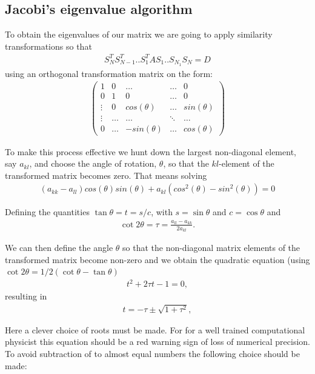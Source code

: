 \documentclass[11pt,a4paper,english,draft]{article}
\numberwithin{equation}{section}
\begin{document}
\subsection{Jacobi's eigenvalue algorithm}

To obtain the eigenvalues of our matrix we are going to apply similarity transformations so that
\begin{align*}
S_N^T S_{N-1}^T .. S_1^T A S_1 .. S_{N_1} S_{N} = D
\end{align*}
using an orthogonal transformation matrix on the form:
\begin{align*}
\begin{pmatrix} 1 & 0 & \dots   & \dots    & 0     \\
                0 & 1 & 0 & \dots    & 0   \\
                \vdots & 0 & cos(\theta) & \dots  & sin(\theta)        \\
        \vdots  & \dots & \dots & \ddots   &\dots \\
 0   & \dots & -sin(\theta) & \dots  & cos(\theta)  
             \end{pmatrix}
\end{align*}

To make this process effective we hunt down the largest non-diagonal element, say $a_{kl}$, and choose the angle of rotation, $\theta$, so that the $kl$-element of the transformed matrix becomes zero. That means solving
\begin{align*}
(a_{kk}-a_{ll})cos(\theta)sin(\theta)+a_{kl}(cos^2 (\theta) - sin^2 (\theta)) = 0
\end{align*}

Defining the quantities $\tan\theta = t= s/c$, with $s=\sin\theta$ and $c=\cos\theta$ and
\begin{gather}\cot 2\theta=\tau = \frac{a_{ll}-a_{kk}}{2a_{kl}}.
\end{gather}

We can then define the angle $\theta$ so that the non-diagonal matrix elements of the transformed matrix 
 become non-zero and
we obtain the quadratic equation (using $\cot 2\theta=1/2(\cot \theta-\tan\theta)$
\begin{gather}
t^2+2\tau t-1= 0,
\end{gather}
resulting in 
\begin{gather}
  t = -\tau \pm \sqrt{1+\tau^2},
\end{gather}

Here a clever choice of roots must be made. For for a well trained computational physicist this equation should be a red warning sign of loss of numerical precision. To avoid subtraction of to almost equal numbers the following choice should be made:
\end{document}
